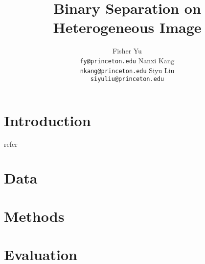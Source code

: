 \documentclass{article} %
\title{Binary Separation on Heterogeneous Image}
\author{
Fisher Yu \\
\texttt{fy@princeton.edu}
\And
Nanxi Kang \\
\texttt{nkang@princeton.edu} 
\And
Siyu Liu\\
\texttt{siyuliu@princeton.edu}
}
\begin{document}
\maketitle

\section{Introduction}
refer~\citet{Besag74}
\section{Data}

\section{Methods}

\section{Evaluation}




\end{document}
